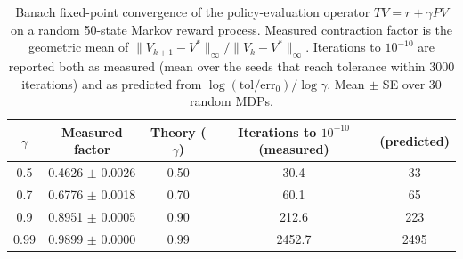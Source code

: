\begin{table}[h]
\centering
\caption{Banach fixed-point convergence of the policy-evaluation operator $TV = r + \gamma P V$ on a random 50-state Markov reward process. Measured contraction factor is the geometric mean of $\|V_{k+1}-V^*\|_\infty / \|V_k-V^*\|_\infty$. Iterations to $10^{-10}$ are reported both as measured (mean over the seeds that reach tolerance within 3000 iterations) and as predicted from $\log(\text{tol}/\text{err}_0)/\log\gamma$. Mean $\pm$ SE over 30 random MDPs.}
\label{tab:prelim_banach}
\begin{tabular}{ccccc}
\hline
$\gamma$ & Measured factor & Theory ($\gamma$) & Iterations to $10^{-10}$ (measured) & (predicted) \\
\hline
0.5 & 0.4626 $\pm$ 0.0026 & 0.50 & 30.4 & 33 \\
0.7 & 0.6776 $\pm$ 0.0018 & 0.70 & 60.1 & 65 \\
0.9 & 0.8951 $\pm$ 0.0005 & 0.90 & 212.6 & 223 \\
0.99 & 0.9899 $\pm$ 0.0000 & 0.99 & 2452.7 & 2495 \\
\hline
\end{tabular}
\end{table}
